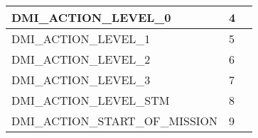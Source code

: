 \documentclass{template/openetcs_article}
\begin{document}
\begin{longtable}{|l|l|l|}
		\begin{minipage}[t]{0.60\linewidth}	DMI\_ACTION\_LEVEL\_0\end{minipage}
	&	\begin{minipage}[t]{0.15\linewidth} 4 	\end{minipage}
	&	\begin{minipage}[t]{0.30\linewidth} \end{minipage} \\
		\hline
		\begin{minipage}[t]{0.60\linewidth}	DMI\_ACTION\_LEVEL\_1\end{minipage}
	&	\begin{minipage}[t]{0.15\linewidth} 5 	\end{minipage}
	&	\begin{minipage}[t]{0.30\linewidth} \end{minipage}\\
		\hline
		\begin{minipage}[t]{0.60\linewidth}	DMI\_ACTION\_LEVEL\_2\end{minipage}
	&	\begin{minipage}[t]{0.15\linewidth} 6 	\end{minipage}
	&	\begin{minipage}[t]{0.30\linewidth} \end{minipage}\\
		\hline
		\begin{minipage}[t]{0.60\linewidth}	DMI\_ACTION\_LEVEL\_3\end{minipage}
	&	\begin{minipage}[t]{0.15\linewidth} 7 	\end{minipage}
	&	\begin{minipage}[t]{0.30\linewidth} \end{minipage}\\
		\hline
		\begin{minipage}[t]{0.60\linewidth}	DMI\_ACTION\_LEVEL\_STM\end{minipage}
	&	\begin{minipage}[t]{0.15\linewidth} 8 	\end{minipage}
	&	\begin{minipage}[t]{0.30\linewidth} \end{minipage}\\
		\hline
		\begin{minipage}[t]{0.60\linewidth}	DMI\_ACTION\_START\_OF\_MISSION\end{minipage}
	&	\begin{minipage}[t]{0.15\linewidth} 9 	\end{minipage}

\end{longtable}
\end{document}
